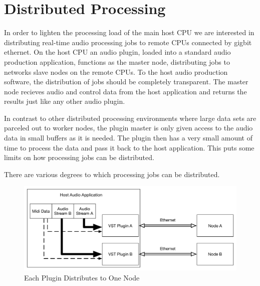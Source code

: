 \section{Distributed Processing}

In order to lighten the processing load of the main host CPU we are interested in distributing real-time audio processing jobs to remote CPUs connected by gigbit ethernet. On the host CPU an audio plugin, loaded into a standard audio production application, functions as the master node, distributing jobs to networks slave nodes on the remote CPUs. To the host audio production software, the distribution of jobs should be completely transparent. The master node recieves audio and control data from the host application and returns the results just like any other audio plugin.

In contrast to other distributed processing environments where large data sets are parceled out to worker nodes, the plugin master is only given access to the audio data in small buffers as it is needed. The plugin then has a very small amount of time to process the data and pass it back to the host application. This puts some limits on how processing jobs can be distributed.

There are various degrees to which processing jobs can be distributed.


\begin{figure}[h]
    \centering
    \includegraphics[width=\textwidth]{assets/distribution_1to1.pdf}
    \caption{Each Plugin Distributes to One Node}
    \label{fig:one_to_one}
\end{figure}

